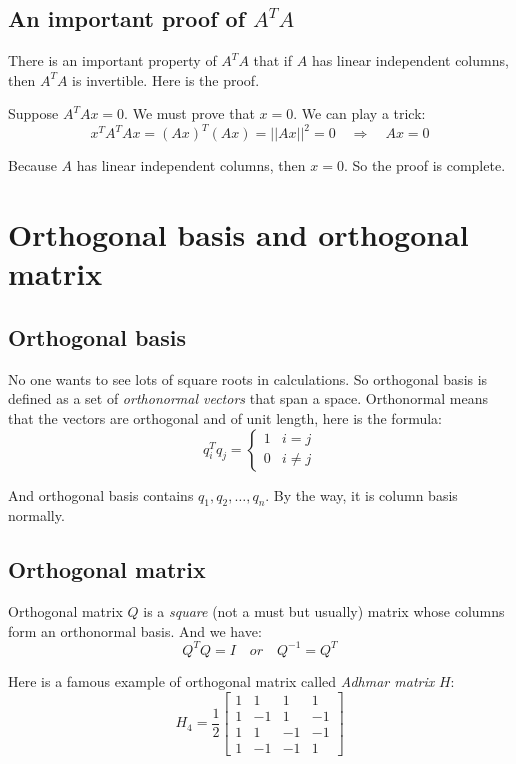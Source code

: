 \documentclass[10pt,a4paper,oneside,numbers=noenddot]{scrbook}
\theoremstyle{ctplain}
\theoremstyle{ctresult}
\begin{document}
\subsection{An important proof of $A^{T}A$}

There is an important property of $A^{T}A$ that if $A$ has linear independent columns,
then $A^{T}A$ is invertible. Here is the proof.

Suppose $A^{T}Ax = 0$. We must prove that $x = 0$. We can play a trick:
\[
  x^{T}A^{T}Ax = (Ax)^{T}(Ax) = ||Ax||^{2} = 0 \quad \Rightarrow \quad Ax = 0
\]

Because $A$ has linear independent columns, then $x = 0$. So the proof is complete.

\section{Orthogonal basis and orthogonal matrix}
\subsection{Orthogonal basis}

No one wants to see lots of square roots in calculations. So orthogonal basis is defined
as a set of \emph{orthonormal vectors} that span a space. Orthonormal means that the
vectors are orthogonal and of unit length, here is the formula:
\[
  q_i^{T}q_j = \begin{cases}
    1 & i = j \\
    0 & i \neq j
  \end{cases}
\]

And orthogonal basis contains $q_1, q_2, \ldots, q_n$. By the way, it is column basis
normally.

\subsection{Orthogonal matrix}

Orthogonal matrix $Q$ is a \emph{square} (not a must but usually) matrix whose columns
form an orthonormal basis. And we have:
\[
  Q^{T}Q = I \quad or \quad Q^{-1} = Q^{T}
\]

Here is a famous example of orthogonal matrix called \emph{Adhmar matrix} $H$:
\[
  H_4 = \frac12 \begin{bmatrix}
    1 & 1 & 1 & 1 \\
    1 & -1 & 1 & -1 \\
    1 & 1 & -1 & -1 \\
    1 & -1 & -1 & 1
  \end{bmatrix}
\]
\end{document}
